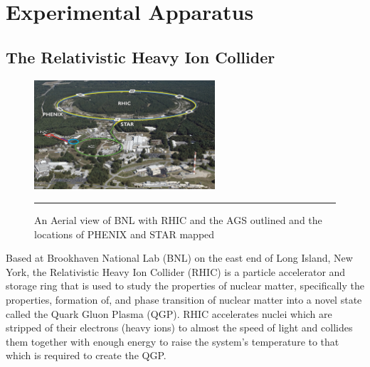 
\chapter{Experimental Apparatus} %
\label{apparatus}

\section{The Relativistic Heavy Ion Collider}
\begin{figure}[htbp]
  \centering
    \includegraphics[width=0.6\textwidth]{Figures/RHIC-aerial-HR.jpg}
    \rule{35em}{0.5pt}
  \caption[An Aerial view of BNL]{An Aerial view of BNL with RHIC and the AGS outlined and the locations of PHENIX and STAR mapped}
  \label{fig:Aerial RHIC}
\end{figure}
\indent Based at Brookhaven National Lab (BNL) on the east end of Long Island, New York, the Relativistic Heavy Ion Collider (RHIC) is a particle accelerator and storage ring that is used to study the properties of nuclear matter, specifically the properties, formation of, and phase transition of nuclear matter into a novel state called the Quark Gluon Plasma (QGP).  RHIC accelerates nuclei which are stripped of their electrons (heavy ions) to almost the speed of light and collides them together with enough energy to raise the system's temperature to that which is required to create the QGP. 

